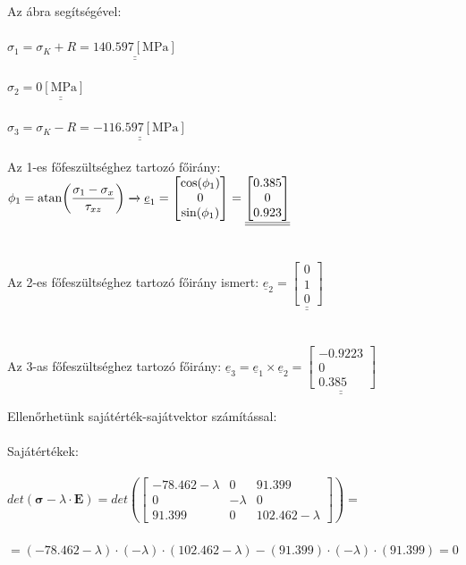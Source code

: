 \documentclass[10pt, a4paper]{article}
\newcommand{\ellenorzes}{\begin{trivlist}\item[\hskip \labelsep {\bfseries 
			{Ellenőrzés:}}]\end{trivlist}}
\newcommand{\mpa}{\mathrm{\left[MPa\right]}}
\begin{document}
	Az ábra segítségével:\\\\
	$\sigma_1 = \sigma_K + R = \underline{\underline{140.597 \mpa}}$\\\\
	$\sigma_2 = \underline{\underline{0 \mpa}}$\\\\
	$\sigma_3 = \sigma_K - R = \underline{\underline{-116.597 \mpa}}$\\\\
	Az 1-es főfeszültséghez tartozó főirány: $\phi_1 = \atan(\dfrac{\sigma_1 - \sigma_x}{\tau_{xz}}) \xrightarrow{} \underline{e}_1 = \begin{bmatrix}\cos(\phi_1) \\ 0 \\ \sin(\phi_1)\end{bmatrix} = \underline{\underline{\begin{bmatrix}0.385 \\ 0 \\ 0.923\end{bmatrix}}}$\\\\\\
	Az 2-es főfeszültséghez tartozó főirány ismert: $\underline{e}_2 = \underline{\underline{\begin{bmatrix}0 \\ 1 \\ 0\end{bmatrix}}}$ \\\\\\
	Az 3-as főfeszültséghez tartozó főirány:
	$\underline{e}_3 = \underline{e}_1 \times \underline{e}_2 = \underline{\underline{\begin{bmatrix}-0.9223 \\ 0 \\ 0.385\end{bmatrix}}}$
	\newpage
	\ellenorzes
	Ellenőrhetünk sajátérték-sajátvektor számítással:\\\\
	Sajátértékek:\\\\
	$det(\boldsymbol{\sigma} - \lambda \cdot \textbf{E}) = det\left(\begin{bmatrix}
		-78.462-\lambda & 0 & 91.399\\
		0 & -\lambda & 0\\
		91.399 & 0 & 102.462-\lambda
	\end{bmatrix}\right) =$\\\\ $= (-78.462-\lambda) \cdot (-\lambda) \cdot (102.462-\lambda) - (91.399) \cdot (-\lambda) \cdot (91.399) = 0$\\\\
\end{document}
